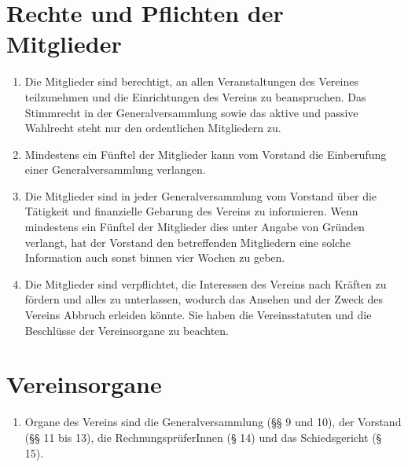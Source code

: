 \documentclass[a4paper,12pt]{article}
\begin{document}
\section{Rechte und Pflichten der Mitglieder} %
\label{sec:rechte-und-pflichten}
\begin{enumerate}
\item\label{item:mitglieder-stimmrecht} Die Mitglieder sind berechtigt, an allen Veranstaltungen des Vereines teilzunehmen und die Einrichtungen des Vereins zu beanspruchen. Das Stimmrecht in der Generalversammlung sowie das aktive und passive Wahlrecht steht nur den ordentlichen Mitgliedern zu.

\item Mindestens ein Fünftel der Mitglieder kann vom Vorstand die Einberufung einer Generalversammlung verlangen.

\item Die Mitglieder sind in jeder Generalversammlung vom Vorstand über die Tätigkeit und finanzielle Gebarung des Vereins zu informieren. Wenn mindestens ein Fünftel der Mitglieder dies unter Angabe von Gründen verlangt, hat der Vorstand den betreffenden Mitgliedern eine solche Information auch sonst binnen vier Wochen zu geben.

\item Die Mitglieder sind verpflichtet, die Interessen des Vereins nach Kräften zu fördern und alles zu unterlassen, wodurch das Ansehen und der Zweck des Vereins Abbruch erleiden könnte. Sie haben die Vereinsstatuten und die Beschlüsse der Vereinsorgane zu beachten.
\end{enumerate}

\section{Vereinsorgane} %
\begin{enumerate}
\item Organe des Vereins sind die Generalversammlung (§§ 9 und 10), der Vorstand (§§ 11 bis 13), die RechnungsprüferInnen (§ 14) und das Schiedsgericht (§ 15).
\end{enumerate}
\end{document}
